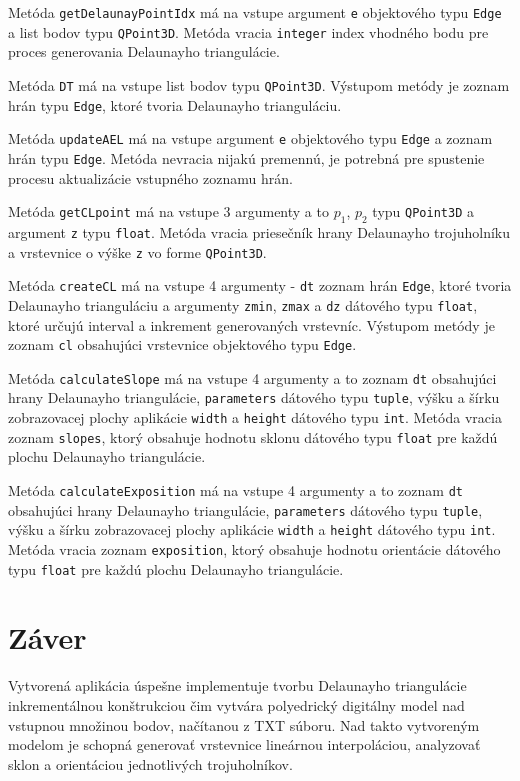 \documentclass[11pt]{article}
\begin{document}
\begin{enumerate}
    Metóda \texttt{getDelaunayPointIdx} má na vstupe argument \texttt{e} objektového typu \texttt{Edge} a list bodov typu \texttt{QPoint3D}. Metóda vracia \texttt{integer} index vhodného bodu pre proces generovania Delaunayho triangulácie.
    
    Metóda \texttt{DT} má na vstupe list bodov typu \texttt{QPoint3D}. Výstupom metódy je zoznam hrán typu \texttt{Edge}, ktoré tvoria Delaunayho trianguláciu. 
    
    Metóda \texttt{updateAEL} má na vstupe argument \texttt{e} objektového typu \texttt{Edge} a zoznam hrán typu \texttt{Edge}. Metóda nevracia nijakú premennú, je potrebná pre spustenie procesu aktualizácie vstupného zoznamu hrán. 
    
    Metóda \texttt{getCLpoint} má na vstupe 3 argumenty a to \texttt{$p_1$}, \texttt{$p_2$} typu \texttt{QPoint3D} a argument \texttt{z} typu \texttt{float}. Metóda vracia priesečník hrany Delaunayho trojuholníku a vrstevnice o výške \texttt{z} vo forme \texttt{QPoint3D}. 
    
    Metóda \texttt{createCL} má na vstupe 4 argumenty - \texttt{dt} zoznam hrán \texttt{Edge}, ktoré tvoria Delaunayho trianguláciu a argumenty \texttt{zmin}, \texttt{zmax} a \texttt{dz} dátového typu \texttt{float}, ktoré určujú interval a inkrement generovaných vrstevníc. Výstupom metódy je zoznam \texttt{cl} obsahujúci vrstevnice objektového typu \texttt{Edge}. 
    
    Metóda \texttt{calculateSlope} má na vstupe 4 argumenty a to zoznam \texttt{dt} obsahujúci hrany Delaunayho triangulácie, \texttt{parameters} dátového typu \texttt{tuple}, výšku a šírku zobrazovacej plochy aplikácie \texttt{width} a \texttt{height} dátového typu \texttt{int}. Metóda vracia zoznam \texttt{slopes}, ktorý obsahuje hodnotu sklonu dátového typu \texttt{float} pre každú plochu Delaunayho triangulácie. 
    
    Metóda \texttt{calculateExposition} má na vstupe 4 argumenty a to zoznam \texttt{dt} obsahujúci hrany Delaunayho triangulácie, \texttt{parameters} dátového typu \texttt{tuple}, výšku a šírku zobrazovacej plochy aplikácie \texttt{width} a \texttt{height} dátového typu \texttt{int}. Metóda vracia zoznam \texttt{exposition}, ktorý obsahuje hodnotu orientácie dátového typu \texttt{float} pre každú plochu Delaunayho triangulácie. 
    
    
\end{enumerate}

 
\newpage
\section{Záver}
Vytvorená aplikácia úspešne implementuje tvorbu Delaunayho triangulácie inkrementálnou konštrukciou čim vytvára polyedrický digitálny model nad vstupnou množinou bodov, načítanou z TXT súboru. Nad takto vytvoreným modelom je schopná generovať vrstevnice lineárnou interpoláciou, analyzovať sklon a orientáciou jednotlivých trojuholníkov.
\end{document}
